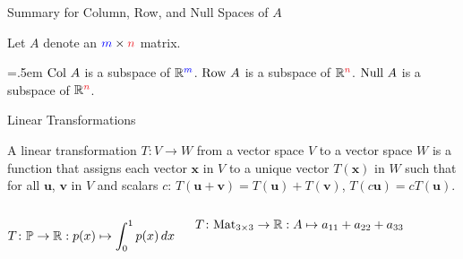 \documentclass[xcolor=dvipsnames,aspectratio=169,t]{beamer}
\begin{document}
% 
% 
% 


\begin{frame}{Summary for Column, Row, and Null Spaces of $A$}
\bigskip

Let $A$ denote an $\colorb{m} \times \colorr{n}$ matrix.
\medskip

\bb[(a)]\itemsep=.5em
\ii $\mbox{Col } A$ is a subspace of $\mathbb{R}^{\textcolor{blue}{m}}$. \medskip
\ii $\mbox{Row } A$ is a subspace of $\R^{\colorr{n}}$. \medskip
\ii $\mbox{Null } A$ is a subspace of $\R^{\colorr{n}}$. \medskip
\ee

\end{frame}

\begin{frame}{Linear Transformations}

\bbox
A \alert{linear transformation} $T\colon V \to W$ from a vector space $V$ to a vector space $W$ is a function that assigns each vector $\mathbf{x}$ in $V$ to a unique vector $T(\mathbf{x})$ in $W$ such that 
for all $\mathbf{u}$, $\mathbf{v}$ in $V$ and scalars $c$:
\bb
\ii $T(\mathbf{u} + \mathbf{v} ) = T(\mathbf{u}) + T(\mathbf{v})$,
\ii $T(c \mathbf{u} ) = c T( \mathbf{u} )$.
\ee
\ebox

\begin{columns}[T]

\column{0.5\tw}

$\displaystyle T\colon \mathbb{P} \to \mathbb{R}: p(x) \mapsto \int_0^1 p(x) \, dx $

\column{0.5\tw}

$\displaystyle T\colon \mbox{Mat}_{3 \times 3} \to \mathbb{R}: A \mapsto a_{11}+a_{22}+a_{33}$

\end{columns}

\vspace{2in}

\end{frame}
\end{document}
